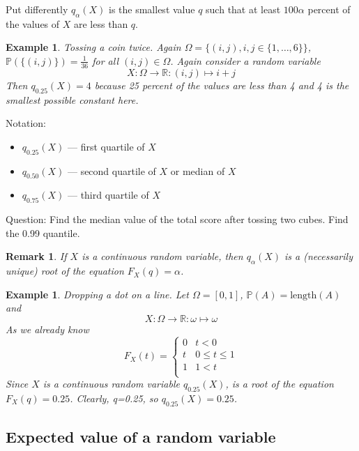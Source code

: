 \documentclass[12pt]{article}
\newtheorem{remark}[theorem]{Remark}
\newtheorem{example}[theorem]{Example}
\begin{document}
Put differently $q_\alpha(X)$ is the smallest value $q$ such that at least
$100\alpha$ percent of the values of $X$ are less than $q$.

\begin{example} Tossing a coin twice. Again $\Omega=\{(i,j),
        i,j\in \{1,\ldots,6\} \}$, $\mathbb{P}(\{(i,j) \})=\frac{1}{36}$ for all
    $(i,j)\in \Omega$. Again consider a random variable
    $$
        X:\Omega\to\mathbb{R}:(i,j)\mapsto i+j
    $$
    Then $q_{0.25}(X)=4$ because 25 percent of the values are less than 4 and 4
    is the smallest possible constant here.
\end{example}

Notation:
\begin{itemize}
    \item $q_{0.25}(X)$ --- first quartile of $X$
    \item $q_{0.50}(X)$ --- second quartile of $X$ or median of $X$
    \item $q_{0.75}(X)$ --- third quartile of $X$
\end{itemize}

Question: Find the median value of the total score after tossing two cubes. Find
the 0.99 quantile.

\begin{remark} If $X$ is a continuous random variable, then $q_\alpha(X)$ is a
    (necessarily unique) root of the equation $F_X(q)=\alpha$.
\end{remark}

\begin{example} Dropping a dot on a line. Let $\Omega=[0,1]$,
    $\mathbb{P}(A)=\mbox{length}(A)$ and
    $$
        X:\Omega\to\mathbb{R}:\omega\mapsto \omega
    $$
    As we already know
    $$
        F_X(t)
        =\begin{cases}
            0 & t < 0          \\
            t & 0\leq t \leq 1 \\
            1 & 1 < t          \\
        \end{cases}
    $$
    Since $X$ is a continuous random variable $q_{0.25}(X)$, is a root of the
    equation $F_X(q)=0.25$. Clearly, q=0.25, so $q_{0.25}(X)=0.25$.
\end{example}


\subsection{Expected value of a random variable}
\end{document}
